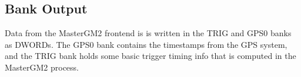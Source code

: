 \subsection{Bank Output}

Data from the MasterGM2 frontend is is written in the TRIG and GPS0 banks as DWORDs. The GPS0 bank contains the timestamps from the GPS system, and the TRIG bank holds some basic trigger timing info that is computed in the MasterGM2 process.
